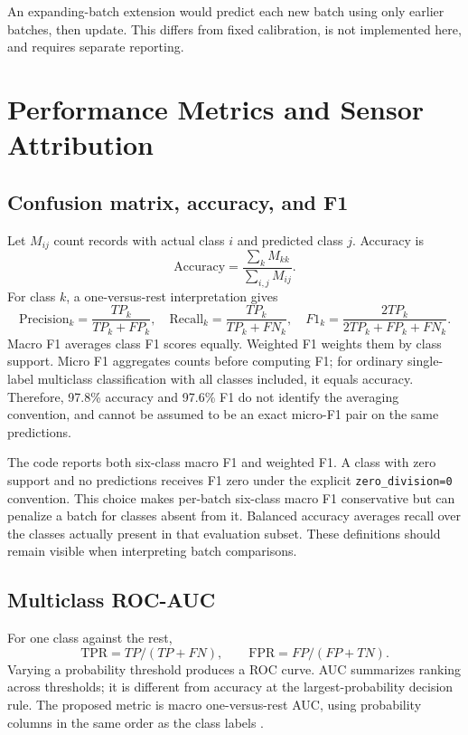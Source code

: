 \documentclass[11pt,a4paper]{article}
\newcommand{\sectionpage}[1]{\clearpage\section{#1}}
\begin{document}
An expanding-batch extension would predict each new batch using only earlier batches, then update. This differs from fixed calibration, is not implemented here, and requires separate reporting.

\sectionpage{Performance Metrics and Sensor Attribution}
\subsection{Confusion matrix, accuracy, and F1}
Let $M_{ij}$ count records with actual class $i$ and predicted class $j$. Accuracy is
\begin{equation}
\mathrm{Accuracy}=\frac{\sum_kM_{kk}}{\sum_{i,j}M_{ij}}.
\end{equation}
For class $k$, a one-versus-rest interpretation gives
\begin{equation}
\mathrm{Precision}_k=\frac{TP_k}{TP_k+FP_k},\quad
\mathrm{Recall}_k=\frac{TP_k}{TP_k+FN_k},\quad
F1_k=\frac{2TP_k}{2TP_k+FP_k+FN_k}.
\end{equation}
Macro F1 averages class F1 scores equally. Weighted F1 weights them by class support. Micro F1 aggregates counts before computing F1; for ordinary single-label multiclass classification with all classes included, it equals accuracy. Therefore, 97.8\% accuracy and 97.6\% F1 do not identify the averaging convention, and cannot be assumed to be an exact micro-F1 pair on the same predictions.

The code reports both six-class macro F1 and weighted F1. A class with zero support and no predictions receives F1 zero under the explicit \texttt{zero\_division=0} convention. This choice makes per-batch six-class macro F1 conservative but can penalize a batch for classes absent from it. Balanced accuracy averages recall over the classes actually present in that evaluation subset. These definitions should remain visible when interpreting batch comparisons.

\subsection{Multiclass ROC-AUC}
For one class against the rest,
\begin{equation}
\mathrm{TPR}=TP/(TP+FN),\qquad \mathrm{FPR}=FP/(FP+TN).
\end{equation}
Varying a probability threshold produces a ROC curve. AUC summarizes ranking across thresholds; it is different from accuracy at the largest-probability decision rule. The proposed metric is macro one-versus-rest AUC, using probability columns in the same order as the class labels \cite{auc}.
\end{document}
